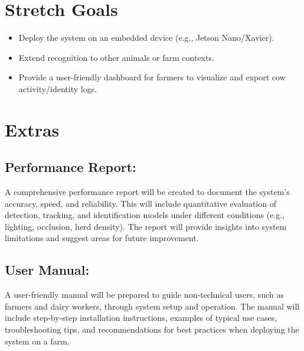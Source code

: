 \documentclass{article}
\begin{document}
\section{Stretch Goals}
    \begin{itemize}
        \item Deploy the system on an embedded device (e.g., Jetson Nano/Xavier).
        \item Extend recognition to other animals or farm contexts.
        \item Provide a user-friendly dashboard for farmers to visualize and export cow activity/identity logs.
    \end{itemize}


\section{Extras}
    \subsection{Performance Report:}
        A comprehensive performance report will be created to document the system's 
        accuracy, speed, and reliability. This will include quantitative evaluation of detection, tracking, 
        and identification models under different conditions (e.g., lighting, occlusion, herd density). 
        The report will provide insights into system limitations and suggest areas for future improvement.
    \subsection{User Manual:}
        A user-friendly manual will be prepared to guide non-technical users, such as farmers 
        and dairy workers, through system setup and operation. The manual will include step-by-step installation 
        instructions, examples of typical use cases, troubleshooting tips, and recommendations for best practices 
        when deploying the system on a farm.




\end{document}
